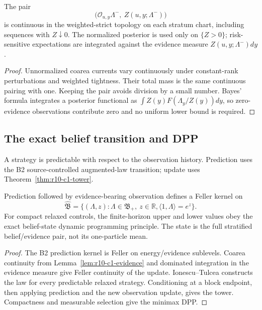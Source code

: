 \begin{lemma}
\label{lem:r10-c1-evidence}
The pair
\[
 \bigl(\mathcal O_{u,y}\Lambda^-,\ Z(u,y;\Lambda^-)\bigr)
\]
is continuous in the weighted-strict topology on each stratum chart, including
sequences with \(Z\downarrow0\).  The normalized posterior is used only on
\(\{Z>0\}\); risk-sensitive expectations are integrated against the evidence
measure \(Z(u,y;\Lambda^-)dy\).
\end{lemma}

\begin{proof}
Unnormalized coarea currents vary continuously under constant-rank
perturbations and weighted tightness.  Their total mass is the same continuous
pairing with one.  Keeping the pair avoids division by a small number.  Bayes'
formula integrates a posterior functional as
\(\int Z(y)F(\Lambda_y/Z(y))dy\), so zero-evidence observations contribute
zero and no uniform lower bound is required.
\end{proof}

\subsection{The exact belief transition and DPP}

A strategy is predictable with respect to the observation history.  Prediction
uses the B2 source-controlled augmented-law transition; update uses
Theorem~\ref{thm:r10-c1-tower}.

\begin{theorem}
\label{thm:r10-c1-dpp}
Prediction followed by evidence-bearing observation defines a Feller kernel on
\[
 \widehat{\mathfrak B}
 =\{(\Lambda,z):\Lambda\in\mathfrak B_+,\ z\in\mathbb R,
   \langle1,\Lambda\rangle=e^z\}.
\]
For compact relaxed controls, the finite-horizon upper and lower values obey
the exact belief-state dynamic programming principle.  The state is the full
stratified belief/evidence pair, not its one-particle mean.
\end{theorem}

\begin{proof}
The B2 prediction kernel is Feller on energy/evidence sublevels.  Coarea
continuity from Lemma~\ref{lem:r10-c1-evidence} and dominated integration in
the evidence measure give Feller continuity of the update.  Ionescu--Tulcea
constructs the law for every predictable relaxed strategy.  Conditioning at
a block endpoint, then applying prediction and the new observation update,
gives the tower.  Compactness and measurable selection give the minimax DPP.
\end{proof}

